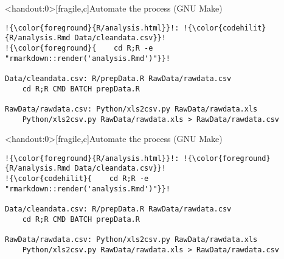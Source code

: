 \documentclass[12pt,t]{beamer}
\begin{document}
\begin{frame}<handout:0>[fragile,c]{Automate the process (GNU Make)}

\addtocounter{framenumber}{-1}

\begin{center}
\begin{minipage}[c]{10.8cm}
\begin{semiverbatim}
\begin{lstlisting}[escapechar=!,linewidth=10.8cm]
!{\color{foreground}{R/analysis.html}}!: !{\color{codehilit}{R/analysis.Rmd Data/cleandata.csv}}!
!{\color{foreground}{    cd R;R -e "rmarkdown::render('analysis.Rmd')"}}!

Data/cleandata.csv: R/prepData.R RawData/rawdata.csv
    cd R;R CMD BATCH prepData.R

RawData/rawdata.csv: Python/xls2csv.py RawData/rawdata.xls
    Python/xls2csv.py RawData/rawdata.xls > RawData/rawdata.csv
\end{lstlisting}
\end{semiverbatim}
\end{minipage}
\end{center}
\end{frame}



\begin{frame}<handout:0>[fragile,c]{Automate the process (GNU Make)}

\addtocounter{framenumber}{-1}

\begin{center}
\begin{minipage}[c]{10.8cm}
\begin{semiverbatim}
\begin{lstlisting}[escapechar=!,linewidth=10.8cm]
!{\color{foreground}{R/analysis.html}}!: !{\color{foreground}{R/analysis.Rmd Data/cleandata.csv}}!
!{\color{codehilit}{    cd R;R -e "rmarkdown::render('analysis.Rmd')"}}!

Data/cleandata.csv: R/prepData.R RawData/rawdata.csv
    cd R;R CMD BATCH prepData.R

RawData/rawdata.csv: Python/xls2csv.py RawData/rawdata.xls
    Python/xls2csv.py RawData/rawdata.xls > RawData/rawdata.csv
\end{lstlisting}
\end{semiverbatim}
\end{minipage}
\end{center}
\end{frame}
\end{document}
